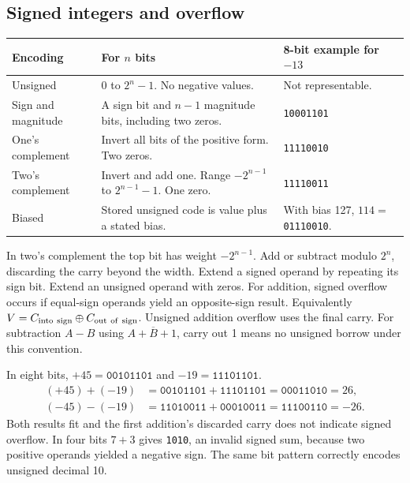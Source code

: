 \documentclass[12pt,a4paper]{article}
\begin{document}
\subsection{Signed integers and overflow}
\par\vspace{6pt}\noindent
\begin{tabularx}{\linewidth}{|B{3.5cm}|Y|Y|}\hline
Encoding & For $n$ bits & 8-bit example for $-13$ \\ \hline
Unsigned & $0$ to $2^n-1$. No negative values. & Not representable. \\ \hline
Sign and magnitude & A sign bit and $n-1$ magnitude bits, including two zeros. & \texttt{10001101} \\ \hline
One's complement & Invert all bits of the positive form. Two zeros. & \texttt{11110010} \\ \hline
Two's complement & Invert and add one. Range $-2^{n-1}$ to $2^{n-1}-1$. One zero. & \texttt{11110011} \\ \hline
Biased & Stored unsigned code is value plus a stated bias. & With bias 127, $114=$ \texttt{01110010}. \\ \hline
\end{tabularx}

In two's complement the top bit has weight $-2^{n-1}$. Add or subtract modulo $2^n$, discarding the carry beyond the width. Extend a signed operand by repeating its sign bit. Extend an unsigned operand with zeros. For addition, signed overflow occurs if equal-sign operands yield an opposite-sign result. Equivalently $V=C_{\rm into\ sign}\oplus C_{\rm out\ of\ sign}$. Unsigned addition overflow uses the final carry. For subtraction $A-B$ using $A+\overline B+1$, carry out 1 means no unsigned borrow under this convention.
\begin{tcolorbox}[examplebox,title={Trace signed arithmetic and test the result}]
In eight bits, $+45=\texttt{00101101}$ and $-19=\texttt{11101101}$.
\[
\begin{aligned}
(+45)+(-19)&=\texttt{00101101}+\texttt{11101101}
             =\texttt{00011010}=26,\\
(-45)-(-19)&=\texttt{11010011}+\texttt{00010011}
             =\texttt{11100110}=-26.
\end{aligned}
\]
Both results fit and the first addition's discarded carry does not indicate signed overflow. In four bits $7+3$ gives \texttt{1010}, an invalid signed sum, because two positive operands yielded a negative sign. The same bit pattern correctly encodes unsigned decimal 10.
\end{tcolorbox}
\end{document}
